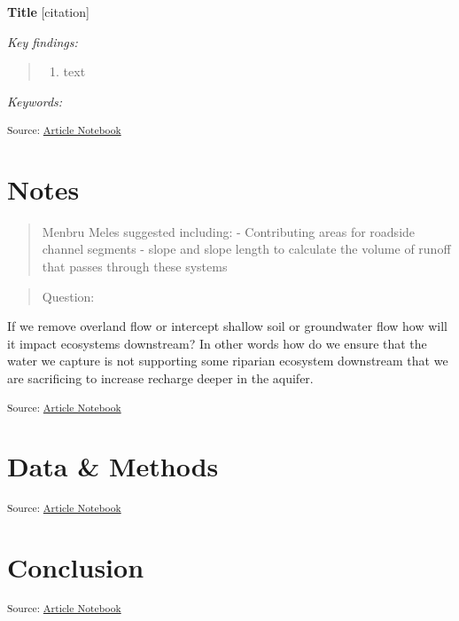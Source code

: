 \documentclass[
]{agujournal2019}
\providecommand{\tightlist}{%
  \setlength{\itemsep}{0pt}\setlength{\parskip}{0pt}}\usepackage{longtable,booktabs,array}
\begin{document}
\textbf{Title} {[}citation{]}

\emph{Key findings:}

\begin{quote}
\begin{enumerate}
\def\labelenumi{\arabic{enumi}.}
\tightlist
\item
  text
\end{enumerate}
\end{quote}

\emph{Keywords:}

\textsubscript{Source:
\href{https://Ryan3Lima.github.io/ATUR-Hillslope-Road/index.ipynb.html}{Article
Notebook}}

\section{Notes}\label{notes}

\begin{quote}
Menbru Meles suggested including: - Contributing areas for roadside
channel segments - slope and slope length to calculate the volume of
runoff that passes through these systems
\end{quote}

\begin{quote}
Question:
\end{quote}

If we remove overland flow or intercept shallow soil or groundwater flow
how will it impact ecosystems downstream? In other words how do we
ensure that the water we capture is not supporting some riparian
ecosystem downstream that we are sacrificing to increase recharge deeper
in the aquifer.

\textsubscript{Source:
\href{https://Ryan3Lima.github.io/ATUR-Hillslope-Road/index.ipynb.html}{Article
Notebook}}

\section{Data \& Methods}\label{sec-data-methods}

\textsubscript{Source:
\href{https://Ryan3Lima.github.io/ATUR-Hillslope-Road/index.ipynb.html}{Article
Notebook}}

\section{Conclusion}\label{sec-conclusions}

\textsubscript{Source:
\href{https://Ryan3Lima.github.io/ATUR-Hillslope-Road/index.ipynb.html}{Article
Notebook}}
\end{document}

